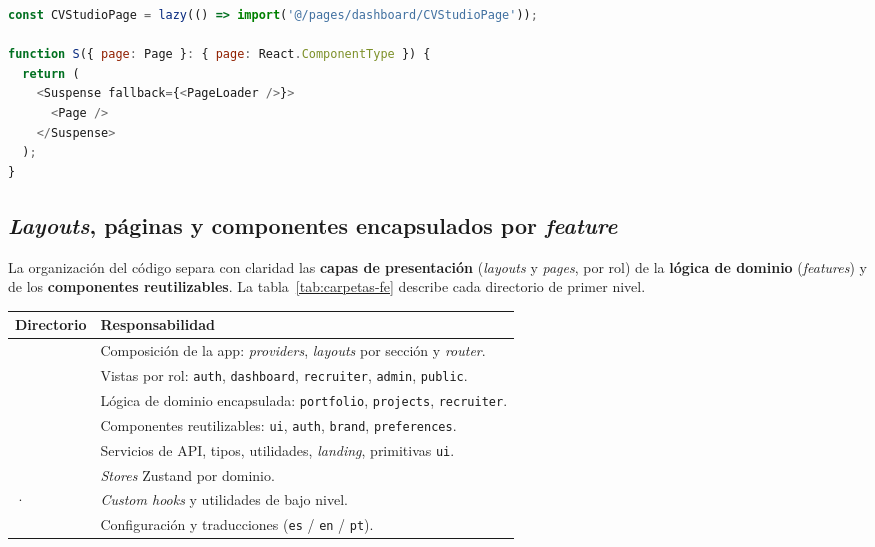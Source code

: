 \begin{lstlisting}[language=JavaScript, caption={Carga diferida de páginas por ruta (\texttt{app/router/index.tsx}).}, label={lst:lazy}]
const CVStudioPage = lazy(() => import('@/pages/dashboard/CVStudioPage'));

function S({ page: Page }: { page: React.ComponentType }) {
  return (
    <Suspense fallback={<PageLoader />}>
      <Page />
    </Suspense>
  );
}
\end{lstlisting}

\subsection{\textit{Layouts}, páginas y componentes encapsulados por \textit{feature}}
\label{subsec:layouts_paginas}

La organización del código separa con claridad las \textbf{capas de presentación}
(\textit{layouts} y \textit{pages}, por rol) de la \textbf{lógica de dominio}
(\textit{features}) y de los \textbf{componentes reutilizables}. La
tabla~\ref{tab:carpetas-fe} describe cada directorio de primer nivel.

\vspace{0.2cm}
\noindent
\renewcommand{\arraystretch}{1.3}
\fontsize{8.5}{10.2}\selectfont\sffamily
\begin{tabularx}{\textwidth}{|L{3.0cm}|Y|}
\hline
{}
\sffamily\textbf{Directorio} & \sffamily\textbf{Responsabilidad} \\
\hline
{} & Composición de la app: \textit{providers}, \textit{layouts} por sección y \textit{router}. \\
\hline
{}
 & Vistas por rol: \texttt{auth}, \texttt{dashboard}, \texttt{recruiter}, \texttt{admin}, \texttt{public}. \\
\hline
{} & Lógica de dominio encapsulada: \texttt{portfolio}, \texttt{projects}, \texttt{recruiter}. \\
\hline
{}
 & Componentes reutilizables: \texttt{ui}, \texttt{auth}, \texttt{brand}, \texttt{preferences}. \\
\hline
{} & Servicios de API, tipos, utilidades, \textit{landing}, primitivas \texttt{ui}. \\
\hline
{}
 & \textit{Stores} Zustand por dominio. \\
\hline
{} ·  & \textit{Custom hooks} y utilidades de bajo nivel. \\
\hline
{}
 & Configuración y traducciones (\texttt{es} / \texttt{en} / \texttt{pt}). \\
\hline
\end{tabularx}
\label{tab:carpetas-fe}

